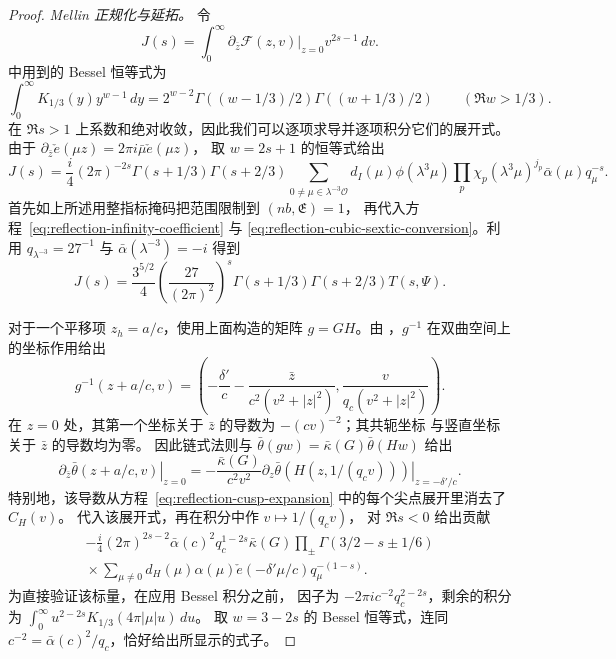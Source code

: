 \documentclass[11pt,a4paper]{article}
\numberwithin{equation}{section}
\numberwithin{figure}{section}
\theoremstyle{definition}
\theoremstyle{remark}
\begin{document}
\begin{proof}
\emph{Mellin 正规化与延拓。}
令
\[
 J(s)=\int_0^\infty
       \left.\partial_{\bar z}\mathcal F(z,v)\right|_{z=0}
       v^{2s-1}\,dv.
\]
\cite[引理~5.3]{DR} 中用到的 Bessel 恒等式为
\[
 \int_0^\infty K_{1/3}(y)y^{w-1}\,dy
  =2^{w-2}\Gamma((w-1/3)/2)\Gamma((w+1/3)/2)
       \qquad(\Re w>1/3).
\]
在 $\Re s>1$ 上系数和绝对收敛，因此我们可以逐项求导并逐项积分它们的展开式。
由于 $\partial_{\bar z}\check e(\mu z)=2\pi i\bar\mu\check e(\mu z)$，
取 $w=2s+1$ 的恒等式给出
\[
 J(s)=\frac i4(2\pi)^{-2s}\Gamma(s+1/3)\Gamma(s+2/3)
       \sum_{0\ne\mu\in\lambda^{-3}\mathcal O}d_I(\mu)\phi(\lambda^3\mu)
          \prod_p\chi_p(\lambda^3\mu)^{j_p}
          \bar\alpha(\mu)q_\mu^{-s}.
\]
首先如上所述用整指标掩码把范围限制到 $(nb,\mathfrak E)=1$，
再代入方程~\eqref{eq:reflection-infinity-coefficient} 与
\eqref{eq:reflection-cubic-sextic-conversion}。利用
$q_{\lambda^{-3}}=27^{-1}$ 与 $\bar\alpha(\lambda^{-3})=-i$ 得到
\begin{equation}\label{eq:reflection-direct-mellin}
 J(s)=\frac{3^{5/2}}4\left(\frac{27}{(2\pi)^2}\right)^s
       \Gamma(s+1/3)\Gamma(s+2/3)T(s,\Psi).
\end{equation}

对于一个平移项 $z_h=a/c$，使用上面构造的矩阵 $g=GH$。由
\cite[方程 (5.1)]{DR}，$g^{-1}$ 在双曲空间上的坐标作用给出
\[
 g^{-1}(z+a/c,v)=
 \left(-\frac{\delta'}c-\frac{\bar z}{c^2(v^2+|z|^2)},
               \frac{v}{q_c(v^2+|z|^2)}\right).
\]
在 $z=0$ 处，其第一个坐标关于
$\bar z$ 的导数为 $-(cv)^{-2}$；其共轭坐标
与竖直坐标关于 $\bar z$ 的导数均为零。
因此链式法则与 $\bar\theta(gw)=\bar\kappa(G)\bar\theta(Hw)$
给出
\[
 \left.\partial_{\bar z}\bar\theta(z+a/c,v)\right|_{z=0}
 =-\frac{\bar\kappa(G)}{c^2v^2}
   \left.\partial_z\bar\theta(H(z,1/(q_cv)))\right|_{z=-\delta'/c}.
\]
特别地，该导数从方程~\eqref{eq:reflection-cusp-expansion} 中的每个尖点展开里消去了 $C_H(v)$。
代入该展开式，再在积分中作 $v\mapsto1/(q_cv)$，
对 $\Re s<0$ 给出贡献
\begin{equation}\label{eq:reflection-reflected-mellin}
 \begin{split}
 -\frac i4(2\pi)^{2s-2}\bar\alpha(c)^2q_c^{1-2s}\bar\kappa(G)
 \prod_{\pm}\Gamma(3/2-s\pm1/6)\\
 {}
 \times\sum_{\mu\ne0}d_H(\mu)\alpha(\mu)
       \check e(-\delta'\mu/c)q_\mu^{-(1-s)}.
 \end{split}
\end{equation}
为直接验证该标量，在应用 Bessel 积分之前，
因子为 $-2\pi i c^{-2}q_c^{2-2s}$，剩余的积分为
$\int_0^\infty u^{2-2s}K_{1/3}(4\pi|\mu|u)\,du$。
取 $w=3-2s$ 的 Bessel 恒等式，连同
$c^{-2}=\bar\alpha(c)^2/q_c$，恰好给出所显示的式子。


\end{proof}
\end{document}
